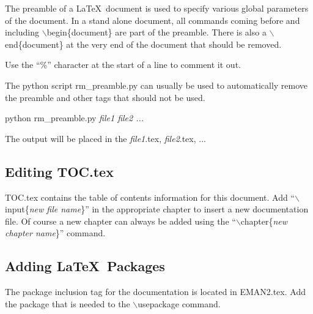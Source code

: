 The preamble of a \LaTeX ~document is used to specify various global
parameters of the document.  In a stand alone document, all commands
coming before and including {$\backslash$begin\{document\}} are part of the
preamble.  There is also a {$\backslash$end\{document\}} at the very end
of the document that should be removed.

Use the ``\%'' character at the  start of a line to comment it out.

The python script rm\_preamble.py can usually be used to automatically remove
the preamble and other tags that should not be used.
\begin {itemize}
  { 
  \item[\%] python rm\_preamble.py \textit{file1 file2 ...}}
\end{itemize}
The output will be placed in the \textit{file1}.tex,
\textit{file2}.tex, ...

\subsection{Editing TOC.tex} \label{ADDING-DOC-TOC}

TOC.tex contains the table of contents information for this document.
Add ``{$\backslash$input\{\textit{new file name}\}}'' in the appropriate
chapter to insert a new documentation file.
Of course a new chapter can always be added using the
``{$\backslash$chapter\{\textit{new chapter name}\}}'' command.


\subsection{Adding \LaTeX ~Packages}

The package inclusion tag for the documentation is located in
EMAN2.tex.  Add the package that is needed to the
{$\backslash$usepackage} command.
